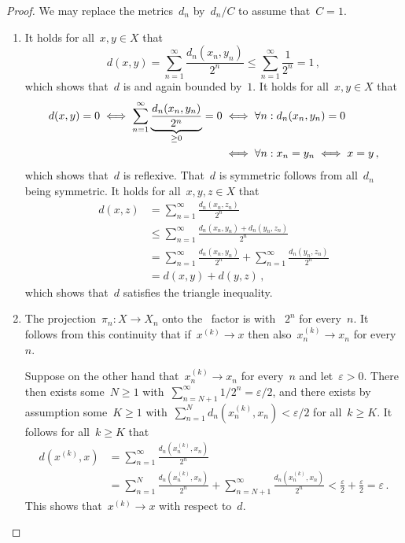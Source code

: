 \begin{proof}
  We may replace the metrics~$d_n$ by~$d_n/C$ to assume that~$C = 1$.
  \begin{enumerate}
    \item
      It holds for all~$x, y \in X$ that
      \[
              d(x,y)
        =     \sum_{n=1}^\infty \frac{d_n(x_n,y_n)}{2^n}
        \leq  \sum_{n=1}^\infty \frac{1}{2^n}
        =     1 \,,
      \]
      which shows that~$d$ is {\welldef} and again bounded by~$1$.
      It holds for all~$x, y \in X$ that
      \begin{align*}
              d(x,y) = 0
         \iff \sum_{n=1}^\infty \underbrace{\frac{d_n(x_n,y_n)}{2^n}}_{\mathclap{\geq 0}} = 0
        &\iff \forall n: d_n(x_n, y_n) = 0  \\
        &\iff \forall n: x_n = y_n
         \iff x = y \,,
      \end{align*}
      which shows that~$d$ is reflexive.
      That~$d$ is symmetric follows from all~$d_n$ being symmetric.
      It holds for all~$x, y, z \in X$ that
      \begin{align*}
              d(x,z)
        &=    \sum_{n=1}^\infty \frac{d_n(x_n,z_n)}{2^n}  \\
        &\leq \sum_{n=1}^\infty \frac{d_n(x_n,y_n) + d_n(y_n,z_n)}{2^n} \\
        &=    \sum_{n=1}^\infty \frac{d_n(x_n,y_n)}{2^n} + \sum_{n=1}^\infty \frac{d_n(y_n,z_n)}{2^n} \\
        &=    d(x,y) + d(y,z) \,,
      \end{align*}
      which shows that~$d$ satisfies the triangle inequality.
    \item
      The projection~$\pi_n \colon X \to X_n$ onto the~ factor is {\lipcont} with {\lipconst}~$2^n$ for every~$n$.
      It follows from this continuity that if~$x^{(k)} \to x$ then also~$x^{(k)}_n \to x_n$ for every~$n$.
      
      Suppose on the other hand that~$x^{(k)}_n \to x_n$ for every~$n$ and let~$\varepsilon > 0$.
      There then exists some~$N \geq 1$ with~$\sum_{n=N+1}^\infty 1/2^n = \varepsilon/2$, and there exists by assumption some~$K \geq 1$ with~$\sum_{n=1}^N d_n( x^{(k)}_n , x_n ) < \varepsilon/2$ for all~$k \geq K$.
      It follows for all~$k \geq  K$ that
      \begin{align*}
            d(x^{(k)}, x)
        &=  \sum_{n=1}^\infty \frac{d_n(x^{(k)}_n, x_n)}{2^n} \\
        &=  \sum_{n=1}^N \frac{d_n(x^{(k)}_n, x_n)}{2^n}
            + \sum_{n=N+1}^\infty \frac{d_n(x^{(k)}_n, x_n)}{2^n}
         <  \frac{\varepsilon}{2} + \frac{\varepsilon}{2}
         =  \varepsilon \,.
      \end{align*}
      This shows that~$x^{(k)} \to x$ with respect to~$d$.
    \qedhere
  \end{enumerate}
\end{proof}




